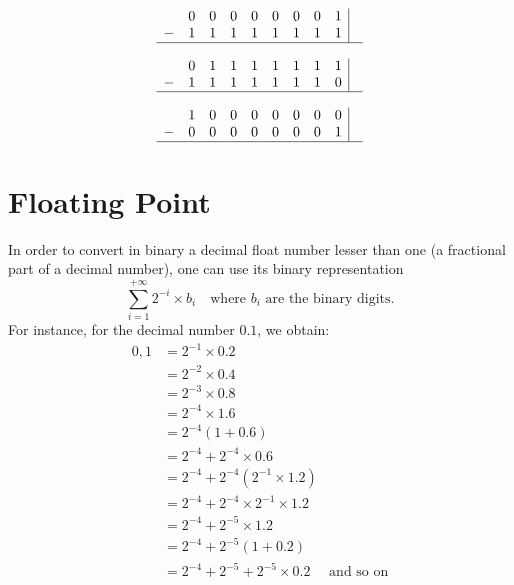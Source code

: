 \documentclass{article}
\begin{document}
\bigskip

$$
\begin{array}{ccccccccc|c}
  & 0 & 0 & 0 & 0 & 0 & 0 & 0 & 1 & \textcolor{blue}{ } \\
- & 1 & 1 & 1 & 1 & 1 & 1 & 1 & 1 & \textcolor{blue}{ } \\
\hline
\end{array}
$$

\bigskip


$$
\begin{array}{ccccccccc|c}
  & 0 & 1 & 1 & 1 & 1 & 1 & 1 & 1 & \textcolor{blue}{ } \\
- & 1 & 1 & 1 & 1 & 1 & 1 & 1 & 0 & \textcolor{blue}{ } \\
\hline
\end{array}
$$

\bigskip

$$
\begin{array}{ccccccccc|c}
  & 1 & 0 & 0 & 0 & 0 & 0 & 0 & 0 & \textcolor{blue}{ } \\
- & 0 & 0 & 0 & 0 & 0 & 0 & 0 & 1 & \textcolor{blue}{ } \\
\hline
\end{array}
$$

\bigskip

\section{Floating Point}


In order to convert in binary  a decimal float number lesser than one (a fractional part of a decimal number), one can use its binary representation
$$ \sum_{i=1}^{+\infty} 2^{-i} \times b_{i} \quad \text{where $b_{i}$ are the binary digits.} $$
For instance, for the decimal number $0.1$, we obtain: 
$$
\begin{aligned}
    0,1 &= 2^{-1} \times 0.2 \\
        &= 2^{-2} \times 0.4 \\
        &= 2^{-3} \times 0.8 \\
        &= 2^{-4} \times 1.6 \\
        &= 2^{-4}(1 + 0.6) \\
        &= 2^{-4} + 2^{-4} \times 0.6 \\
        &= 2^{-4} + 2^{-4}(2^{-1} \times 1.2) \\
        &= 2^{-4} + 2^{-4} \times 2^{-1} \times 1.2 \\
        &= 2^{-4} + 2^{-5} \times 1.2 \\
        &= 2^{-4} + 2^{-5}(1 + 0.2)\\
        &= 2^{-4} + 2^{-5} + 2^{-5}\times  0.2 \quad \text{ and so on}
\end{aligned}
$$
\end{document}
